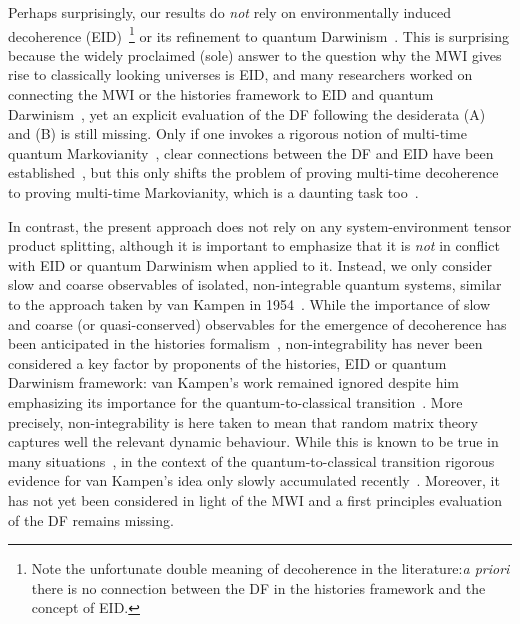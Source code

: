 \documentclass[pre,twocolumn,10pt,aps,longbibliography,nofootinbib]{revtex4-1}
\newcommand{\blue}[1]{#1}
\newcommand{\new}[1]{#1}
\begin{document}
Perhaps surprisingly, our results do \emph{not} rely on environmentally induced decoherence (EID)~\cite{ZurekRMP2003, JoosEtAlBook2003, SchlosshauerPR2019}\footnote{Note the unfortunate double meaning of decoherence in the literature:\emph{a priori} there is no connection between the DF in the histories framework and the concept of EID.} or its refinement to quantum Darwinism~\cite{ZurekNP2009, KorbiczQuantum2021, ZurekEnt2022}. This is surprising because the widely proclaimed (sole) answer to the question why the MWI gives rise to classically looking universes is EID, and many researchers worked on connecting the MWI or the histories framework to EID and quantum Darwinism~\cite{FinkelsteinPRD1993, SaundersFP1993, PazZurekPRD1993, DiosiEtAlPRL1995, BrunPRL1997, YuPA1998, VaidmanISPS1998, BrunPRA2000, RiedelZurekZwolakPRA2016, RiedelPRL2017,  AlbrechtBaunachArrasmithPRD2022, TouilEtAlArXiv2022, StrasbergSP2023}, yet an explicit evaluation of the DF following the desiderata (A) and (B) is still missing. Only if one invokes a rigorous notion of multi-time quantum Markovianity~\cite{PollockEtAlPRL2018, LiHallWisemanPR2018, MilzModiPRXQ2021}, clear connections between the DF and EID have been established~\cite{PazZurekPRD1993, DiosiEtAlPRL1995, BrunPRL1997, YuPA1998, BrunPRA2000, StrasbergSP2023}, but this only shifts the problem of proving multi-time \new{decoherence} to proving multi-time Markovianity, which is a daunting task too~\cite{DuemckeJMP1983, FordOConnellPRL1996, FigueroaRomeroModiPollockQuantum2019, FigueroaRomeroPollockModiCP2021, StrasbergEtAlPRA2023}.

In contrast, the present approach does not rely on any system-environment tensor product splitting, although it is important to emphasize that it is \emph{not} in conflict with EID or quantum Darwinism when applied to it. Instead, we only consider slow and coarse observables of isolated, non-integrable quantum systems, similar to the approach taken by van Kampen in 1954~\cite{VanKampenPhys1954}. While the importance of slow and coarse (or quasi-conserved) observables \new{for the emergence of decoherence} has been \new{anticipated in the histories formalism~\cite{GellMannHartlePRD1993, BrunHalliwellPRD1996, HalliwellPRD1998, HalliwellPRL1999, CalzettaHuPRD1999, HalliwellPRD2003, GellMannHartlePRA2007, HalliwellInBook2010}, non-integrability has never been considered} a key factor by proponents of the histories, EID or quantum Darwinism framework: van Kampen's work \new{remained} ignored despite him emphasizing its importance for the quantum-to-classical transition~\cite{VanKampenEtAlPT2000, VanKampenAJP2008}. \blue{More precisely, non-integrability is here taken to mean that random matrix theory captures well the relevant dynamic behaviour. While this is known to be true in many situations~\cite{Wigner1967, BrodyEtAlRMP1981, BeenakkerRMP1997, GuhrMuellerGroelingWeidenmuellerPR1998, HaakeBook2010, DAlessioEtAlAP2016, DeutschRPP2018}, in the context of the quantum-to-classical transition rigorous evidence for van Kampen's idea only slowly accumulated recently~\cite{GemmerSteinigewegPRE2014, SchmidtkeGemmerPRE2016, NationPorrasPRE2020, StrasbergEtAlPRA2023, StrasbergSP2023}. Moreover}, it has not yet been considered in light of the MWI and \new{a first principles evaluation of the DF remains missing.}
\end{document}
